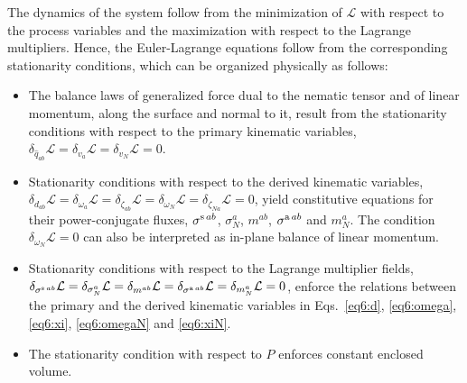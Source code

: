 The dynamics of the system follow from the minimization of $\mathcal{L}$ with respect to the process variables and the maximization with respect to the Lagrange multipliers. Hence, the Euler-Lagrange equations follow from the corresponding stationarity conditions, which can be organized physically as follows: 
\begin{itemize}
	\item The balance laws of generalized force dual to the nematic tensor  and of linear momentum, along the surface and normal to it, result from the stationarity conditions with respect to the primary kinematic variables,  $\delta_{\widehat{q}_{ab}} \mathcal{L} = \delta_{{v_a}}  \mathcal{L} = \delta_{ v_N}  \mathcal{L} = 0$.
	\item Stationarity conditions  with respect to the derived kinematic variables,  $\delta_{d_{ab}}  \mathcal{L} = \delta_{{\omega_a}}  \mathcal{L} = \delta_{ \zeta_{ab}}  \mathcal{L} = \delta_{ \omega_N}  \mathcal{L}  =\delta_{ \zeta_{Na}}  \mathcal{L}= 0$, yield constitutive equations for their power-conjugate fluxes, $\sigma^{\textup{s}  \, ab}$, $\sigma^a_N$, $m^{ab}$, $\sigma^{\textup{a} \, ab}$ and $m_N^a$. The condition $\delta_{ \omega_N}  \mathcal{L} =0$ can also be interpreted as in-plane balance of linear momentum.
	\item Stationarity conditions  with respect to the Lagrange multiplier fields, $\delta_{ \sigma^{\textup{s}  \, ab}}  \mathcal{L} = \delta_{\sigma^a_N}  \mathcal{L} = \delta_{ m^{ab}}  \mathcal{L} = \delta_{\sigma^{\textup{a} \, ab}}  \mathcal{L}  =\delta_{ m_N^a}  \mathcal{L}= 0$,  enforce the relations between the primary and the derived kinematic variables in Eqs.~\eqref{eq6:d}, \eqref{eq6:omega}, \eqref{eq6:xi}, \eqref{eq6:omegaN} and \eqref{eq6:xiN}.
	\item The stationarity condition with respect to $P$ enforces constant enclosed volume.
\end{itemize}


